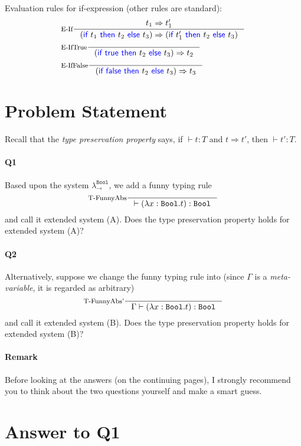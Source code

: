 \documentclass[11pt]{article}
\let\t\texttt
\let\to\rightarrow
\let\reduce\Rightarrow
\newcommand{\Bool}{\t{Bool}}
\newcommand{\kword}[1]{{\color{blue} \textsf{#1}}}
\newcommand{\True}{\kword{true}}
\newcommand{\False}{\kword{false}}
\newcommand{\If}{\kword{if}}
\newcommand{\Then}{\kword{then}}
\newcommand{\Else}{\kword{else}}
\begin{document}
Evaluation rules for if-expression (other rules are standard):
\begin{align*}
    &\inference[E-If]{t_1 \reduce t_1'}{(\If~t_1~\Then~t_2~\Else~t_3) \reduce (\If~t_1'~\Then~t_2~\Else~t_3)} \\
    &\inference[E-IfTrue]{}{(\If~\True~\Then~t_2~\Else~t_3) \reduce t_2} \\
    &\inference[E-IfFalse]{}{(\If~\False~\Then~t_2~\Else~t_3) \reduce t_3}
\end{align*}

\section{Problem Statement}

Recall that the \emph{type preservation property} says, if $\vdash t:T$ and $t \reduce t'$, then $\vdash t':T$.

\paragraph{Q1}

Based upon the system $\lambda_\to^{\Bool}$, we add a funny typing rule
$$
    \inference[T-FunnyAbs]{}{\vdash (\lambda x:\Bool.t) : \Bool}
$$
and call it extended system (A).
Does the type preservation property holds for extended system (A)?

\paragraph{Q2}

Alternatively, suppose we change the funny typing rule into (since $\Gamma$ is a \emph{meta-variable}, it is regarded as arbitrary)
$$
    \inference[T-FunnyAbs']{}{\Gamma \vdash (\lambda x:\Bool.t) : \Bool}
$$
and call it extended system (B).
Does the type preservation property holds for extended system (B)?

\paragraph{Remark} Before looking at the answers (on the continuing pages), I strongly recommend you to think about the two questions yourself and make a smart guess.

\newpage

\section{Answer to Q1}
\end{document}
